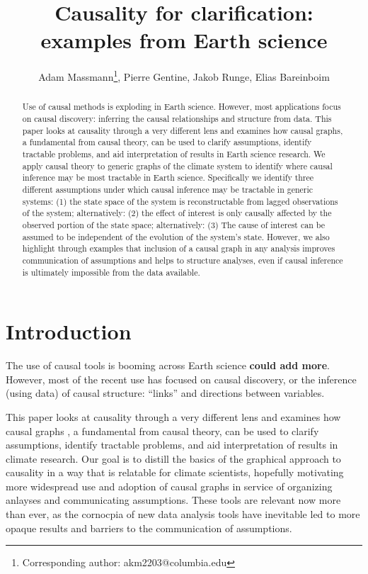\documentclass[12pt]{article}
\begin{document}
\title{Causality for clarification: examples from Earth science}

\author{Adam Massmann\thanks{Corresponding author:
    akm2203@columbia.edu}, Pierre Gentine, Jakob Runge, Elias Bareinboim}

\maketitle
\begin{abstract}
  Use of causal methods is exploding in Earth science. However, most
  applications focus on causal discovery: inferring the causal
  relationships and structure from data. This paper looks at causality
  through a very different lens and examines how causal graphs, a
  fundamental from causal theory, can be used to clarify assumptions,
  identify tractable problems, and aid interpretation of results in
  Earth science research. We apply causal theory to generic graphs of
  the climate system to identify where causal inference may be most
  tractable in Earth science. Specifically we identify three different
  assumptions under which causal inference may be tractable in generic
  systems: (1) the state space of the system is reconstructable from
  lagged observations of the system; alternatively: (2) the effect of
  interest is only causally affected by the observed portion of the
  state space; alternatively: (3) The cause of interest can be assumed
  to be independent of the evolution of the system’s state. However,
  we also highlight through examples that inclusion of a causal graph
  in any analysis improves communication of assumptions and helps to
  structure analyses, even if causal inference is ultimately
  impossible from the data available.

\end{abstract}

\section{Introduction}

The use of causal tools is booming across Earth science
\citep[e.g.,][]{ebert-uphoff2012,
  samarasinghe-casuality,runge-causal-timeseries,runge2019inferring,goodwell-causality-2020}
\textbf{could add more}. However, most of the recent use has focused
on causal discovery, or the inference (using data) of causal
structure: ``links'' and directions between variables.

This paper looks at causality through a very different lens and
examines how causal graphs \citep{pearl1995causal}, a fundamental from
causal theory, can be used to clarify assumptions, identify tractable
problems, and aid interpretation of results in climate research. Our
goal is to distill \citep{olah2017} the basics of the graphical
approach to causality in a way that is relatable for climate
scientists, hopefully motivating more widespread use and adoption of
causal graphs in service of organizing anlayses and communicating
assumptions. These tools are relevant now more than ever, as the
cornocpia of new data analysis tools have inevitable led to more
opaque results and barriers to the communication of assumptions.
\end{document}
